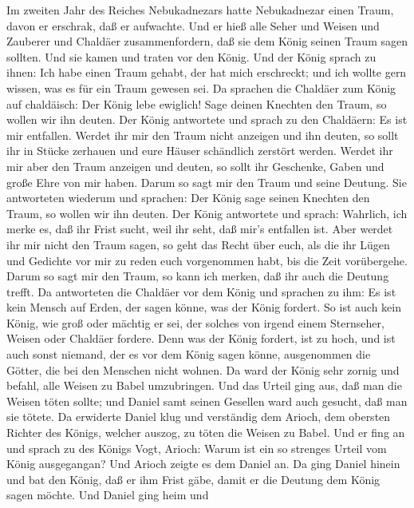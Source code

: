  Im zweiten Jahr des Reiches Nebukadnezars hatte
Nebukadnezar einen Traum, davon er erschrak, daß er aufwachte.
 Und er hieß alle Seher und Weisen und Zauberer und Chaldäer
zusammenfordern, daß sie dem König seinen Traum sagen sollten. Und sie
kamen und traten vor den König.  Und der König sprach zu
ihnen: Ich habe einen Traum gehabt, der hat mich erschreckt; und ich
wollte gern wissen, was es für ein Traum gewesen sei.  Da
sprachen die Chaldäer zum König auf chaldäisch: Der König lebe ewiglich!
Sage deinen Knechten den Traum, so wollen wir ihn deuten. 
Der König antwortete und sprach zu den Chaldäern: Es ist mir entfallen.
Werdet ihr mir den Traum nicht anzeigen und ihn deuten, so sollt ihr in
Stücke zerhauen und eure Häuser schändlich zerstört werden. 
Werdet ihr mir aber den Traum anzeigen und deuten, so sollt ihr
Geschenke, Gaben und große Ehre von mir haben. Darum so sagt mir den
Traum und seine Deutung.  Sie antworteten wiederum und
sprachen: Der König sage seinen Knechten den Traum, so wollen wir ihn
deuten.  Der König antwortete und sprach: Wahrlich, ich
merke es, daß ihr Frist sucht, weil ihr seht, daß mir's entfallen ist.
 Aber werdet ihr mir nicht den Traum sagen, so geht das
Recht über euch, als die ihr Lügen und Gedichte vor mir zu reden euch
vorgenommen habt, bis die Zeit vorübergehe. Darum so sagt mir den Traum,
so kann ich merken, daß ihr auch die Deutung trefft.  Da
antworteten die Chaldäer vor dem König und sprachen zu ihm: Es ist kein
Mensch auf Erden, der sagen könne, was der König fordert. So ist auch
kein König, wie groß oder mächtig er sei, der solches von irgend einem
Sternseher, Weisen oder Chaldäer fordere.  Denn was der
König fordert, ist zu hoch, und ist auch sonst niemand, der es vor dem
König sagen könne, ausgenommen die Götter, die bei den Menschen nicht
wohnen.  Da ward der König sehr zornig und befahl, alle
Weisen zu Babel umzubringen.  Und das Urteil ging aus, daß
man die Weisen töten sollte; und Daniel samt seinen Gesellen ward auch
gesucht, daß man sie tötete.  Da erwiderte Daniel klug und
verständig dem Arioch, dem obersten Richter des Königs, welcher auszog,
zu töten die Weisen zu Babel.  Und er fing an und sprach zu
des Königs Vogt, Arioch: Warum ist ein so strenges Urteil vom König
ausgegangan? Und Arioch zeigte es dem Daniel an.  Da ging
Daniel hinein und bat den König, daß er ihm Frist gäbe, damit er die
Deutung dem König sagen möchte.  Und Daniel ging heim und
